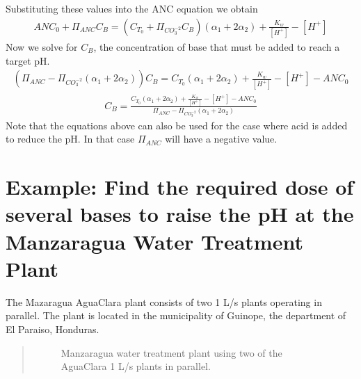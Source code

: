 \documentclass[letterpaper,10pt,english]{sphinxmanual}
\let\sphinxpxdimen\pdfpxdimen\else\newdimen\sphinxpxdimen
\begin{document}
Substituting these values into the ANC equation we obtain
\begin{equation}\label{equation:Rapid_Mix/RM_Examples:Rapid_Mix/RM_Examples:18}
\begin{split}ANC_0 + \Pi_{ANC}C_B = ({C_{T_0}}+ \Pi_{CO_3^{-2}}C_B)({\alpha_1} + 2{\alpha_2}) +  \frac{{{K_w}}}{{\left[ {{H^ + }} \right]}} - \left[ {{H^ + }} \right]\end{split}
\end{equation}
Now we solve for \(C_B\), the concentration of base that must be added to reach a target pH.
\begin{equation}\label{equation:Rapid_Mix/RM_Examples:Rapid_Mix/RM_Examples:19}
\begin{split}(\Pi_{ANC} -\Pi_{CO_3^{-2}}({\alpha_1} + 2{\alpha_2}) )C_B= {C_{T_0}}({\alpha_1} + 2{\alpha_2}) +  \frac{{{K_w}}}{{\left[ {{H^ + }} \right]}} - \left[ {{H^ + }} \right] - ANC_0\end{split}
\end{equation}\begin{equation}\label{equation:Rapid_Mix/RM_Examples:Rapid_Mix/RM_Examples:20}
\begin{split}C_B= \frac{{C_{T_0}}({\alpha_1} + 2{\alpha_2}) +  \frac{{{K_w}}}{{\left[ {{H^ + }} \right]}} - \left[ {{H^ + }} \right] - ANC_0}{\Pi_{ANC} -\Pi_{CO_3^{-2}}({\alpha_1} + 2{\alpha_2})}\end{split}
\end{equation}
Note that the equations above can also be used for the case where acid is added to reduce the pH. In that case \(\Pi_{ANC}\) will have a negative value.


\section{Example: Find the required dose of several bases to raise the pH at the Manzaragua Water Treatment Plant}
\label{\detokenize{Rapid_Mix/RM_Examples:example-find-the-required-dose-of-several-bases-to-raise-the-ph-at-the-manzaragua-water-treatment-plant}}
The Mazaragua AguaClara plant consists of two 1 L/s plants operating in parallel. The plant is located in the municipality of Guinope, the department of El Paraiso, Honduras.
\begin{quote}

\begin{figure}[htbp]
\centering
\capstart

\noindent\sphinxincludegraphics[width=700\sphinxpxdimen]{{Manzaragua_WTP}.jpg}
\caption{Manzaragua water treatment plant using two of the AguaClara 1 L/s plants in parallel.}\label{\detokenize{Rapid_Mix/RM_Examples:id1}}\label{\detokenize{Rapid_Mix/RM_Examples:manzaragua-wtp}}\end{figure}
\end{quote}
\end{document}

